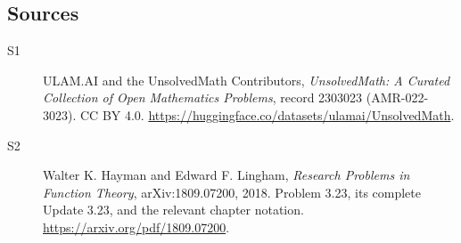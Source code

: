 \documentclass[11pt]{book}
\begin{document}
\subsection{Sources}
\begin{description}
\item[\hypertarget{source:2303023:1}{S1}] ULAM.AI and the UnsolvedMath Contributors, \emph{UnsolvedMath: A Curated Collection of Open Mathematics Problems}, record 2303023 (AMR-022-3023). CC BY 4.0. \url{https://huggingface.co/datasets/ulamai/UnsolvedMath}.
\item[\hypertarget{source:2303023:2}{S2}] Walter K. Hayman and Edward F. Lingham, \emph{Research Problems in Function Theory}, arXiv:1809.07200, 2018. Problem 3.23, its complete Update 3.23, and the relevant chapter notation. \url{https://arxiv.org/pdf/1809.07200}.
\end{description}
\label{end:2303023}
\end{document}
